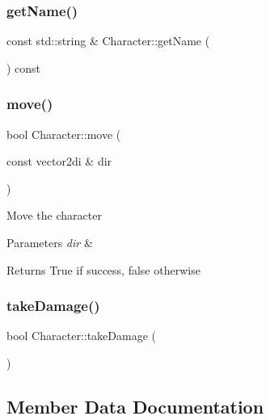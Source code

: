 \mbox{\label{class_character_a631dd8d1785ff701f0fc51615bb017b2}} 
\subsubsection{\texorpdfstring{getName()}{getName()}}
{\footnotesize\ttfamily const std\+::string \& Character\+::get\+Name (\begin{DoxyParamCaption}{ }\end{DoxyParamCaption}) const}

\mbox{\label{class_character_af471f57bd2e938261da62ff3ea98e843}} 
\subsubsection{\texorpdfstring{move()}{move()}}
{\footnotesize\ttfamily bool Character\+::move (\begin{DoxyParamCaption}\item[{const vector2di \&}]{dir }\end{DoxyParamCaption})}

Move the character 
\begin{DoxyParams}{Parameters}
{\em dir} & \\
\hline
\end{DoxyParams}
\begin{DoxyReturn}{Returns}
True if success, false otherwise 
\end{DoxyReturn}
\mbox{\label{class_character_a1b026957e83da9071075228efd11855f}} 
\subsubsection{\texorpdfstring{takeDamage()}{takeDamage()}}
{\footnotesize\ttfamily bool Character\+::take\+Damage (\begin{DoxyParamCaption}{ }\end{DoxyParamCaption})}



\subsection{Member Data Documentation}
\mbox{\label{class_character_a21f61734adec2f02e29027c7750d00d0}} 
